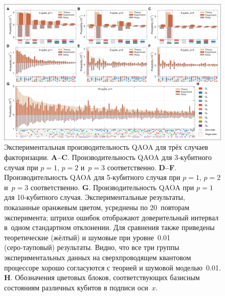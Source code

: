 \begin{figure}
    \centering
    \includegraphics[scale=0.38]{inc/fig_04.png}
    \caption{
        Экспериментальная производительность QAOA для трёх случаев
        факторизации. \textbf{A–C}. Производительность QAOA для 3‑кубитного
        случая при $p = 1$, $p = 2$ и $p = 3$ соответственно. \textbf{D–F}.
        Производительность QAOA для 5‑кубитного случая при $p = 1$, $p = 2$
        и $p = 3$ соответственно. \textbf{G}. Производительность QAOA при $p =
        1$ для 10‑кубитного случая. Экспериментальные результаты, показанные
        оранжевым цветом, усреднены по 20 повторам эксперимента; штрихи ошибок
        отображают доверительный интервал в одном стандартном отклонении. Для
        сравнения также приведены теоретические (жёлтый) и шумовые при
        уровне 0.01 (серо‑тауповый) результаты. Видно, что все три группы
        экспериментальных данных на сверхпроводящем квантовом процессоре хорошо
        согласуются с теорией и шумовой моделью 0.01. \textbf{H}. Обозначения
        цветовых блоков, соответствующих базисным состояниям различных кубитов
        в подписи оси $x$.
    }
    \label{fig:fig04}
\end{figure}

